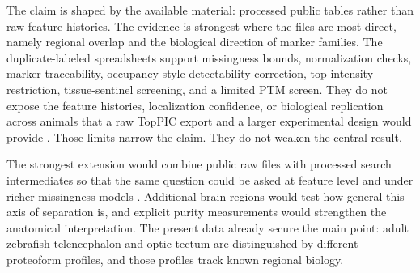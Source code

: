 The claim is shaped by the available material: processed public tables rather than raw feature histories. The evidence is strongest where the files are most direct, namely regional overlap and the biological direction of marker families. The duplicate-labeled spreadsheets support missingness bounds, normalization checks, marker traceability, occupancy-style detectability correction, top-intensity restriction, tissue-sentinel screening, and a limited PTM screen. They do not expose the feature histories, localization confidence, or biological replication across animals that a raw TopPIC export and a larger experimental design would provide \citep{choi2022toppic}. Those limits narrow the claim. They do not weaken the central result.

The strongest extension would combine public raw files with processed search intermediates so that the same question could be asked at feature level and under richer missingness models \citep{karpievitch2012missing,lazar2016missing}. Additional brain regions would test how general this axis of separation is, and explicit purity measurements would strengthen the anatomical interpretation. The present data already secure the main point: adult zebrafish telencephalon and optic tectum are distinguished by different proteoform profiles, and those profiles track known regional biology.
